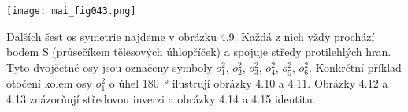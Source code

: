 \begin{mdframed}[style=mdexam]
\begin{example}
    {\centering
      \captionsetup{type=figure}
      \label{mai:fig042}
    \par}

    {\centering
      \captionsetup{type=figure}
      \texttt{[image: mai\_fig043.png]}
      \par}

      Dalších šest os symetrie najdeme v obrázku 4.9. Každá z nich vždy prochází bodem S (průsečíkem
      tělesových úhlopříček) a spojuje středy protilehlých hran. Tyto dvojčetné osy jsou označeny
      symboly \(o_1^2\), \(o_2^2\), \(o_3^2\), \(o_4^2\), \(o_5^2\), \(o_6^2\). Konkrétní příklad
      otočení kolem osy \(o_1^2\) o úhel \qty{180}{\degree} ilustrují obrázky 4.10 a 4.11. Obrázky
      4.12 a 4.13 znázorňují středovou inverzi a obrázky 4.14 a 4.15 identitu.
      

\end{example}
\end{mdframed}
